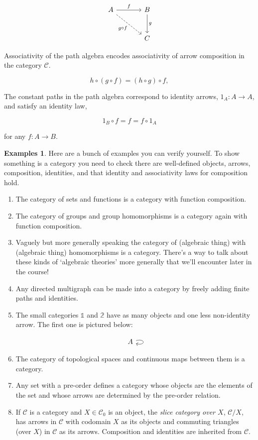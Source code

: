 \documentclass[11pt]{amsart}
\theoremstyle{plain}
\theoremstyle{definition}
\newtheorem*{egs*}{Examples}
\newcommand{\cC}{{\mathcal C}}
\newcommand{\noi}{{\noindent}}
\begin{document}
\[ \begin{tikzcd}[column sep = large, row sep = large]
  A \rar["f"] \ar[dr, dashed, "g \circ f"'] & B \dar["g"] \\
  & C
\end{tikzcd}\]

\noi Associativity of the path algebra encodes associativity of arrow  composition in the category $\cC$. 

\[ h \circ (g \circ f) = (h \circ g) \circ f,\]

\noi The constant paths in the path algebra correspond to identity arrows, $1_A : A \to A$, and satisfy an identity law,

\[ 1_B \circ f = f = f \circ 1_A \]

\noi for any $f : A \to B$.

\begin{egs*}
Here are a bunch of examples you can verify yourself. To show something is a category you need to check there are well-defined objects, arrows, composition, identities, and that identity and associativity laws for composition hold. 
\begin{enumerate}[label=(\alph*)]
\item The category of sets and functions is a category with function composition. 

\item The category of groups and group homomorphisms is a category again with function composition. 

\item Vaguely but more generally speaking the category of (algebraic thing) with (algebraic thing) homomorphisms is a category. There's a way to talk about these kinds of `algebraic theories' more generally that we'll encounter later in the course!

\item Any directed multigraph can be made into a category by freely adding finite paths and identities.
 
\item The small categories $\mathbb{1}$ and $\mathbb{2}$ have as many objects and one less non-identity arrow. The first one is pictured below: 

\[ \begin{tikzcd}
  A \arrow[loop right] 
\end{tikzcd}\]

\item The category of topological spaces and continuous  maps between them is a category. 

\item Any set with a pre-order defines a category whose objects are the elements of the set and whose arrows are determined by the pre-order relation. 

\item If $\cC$ is a category and $X \in \cC_0$ is an object, the \textit{slice category over $X$}, $\cC/X$, has arrows in $\cC$ with codomain $X$ as its objects and commuting triangles (over $X$) in $\cC$ as its arrows. Composition and identities are inherited from $\cC$.
\end{enumerate}

\end{egs*}
\end{document}
